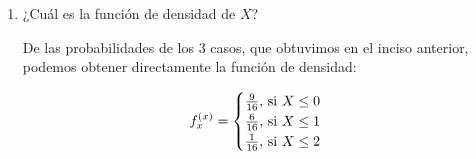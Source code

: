\documentclass[12pt,a4paper]{report}
\begin{document}
\begin{enumerate}
{\begin{enumerate}
{					Tenemos que X toma los valores $X = \{0,1,2\}$\\

					En cada caso hay una posibilidad de $\frac{1}{4}$ de que la bola entre en la primera caja, sea "b" el símbolo que represente una bola en la primera caja y "0" cuando no está en la caja, tendríamos cuatro resultados:\\

					$P(00) = (\frac{3}{4})\cdot(\frac{3}{4})$\\
					$P(0b) = (\frac{3}{4})\cdot(\frac{1}{4})$\\
					$P(b0) = (\frac{1}{4})\cdot(\frac{3}{4})$\\
					$P(bb) = (\frac{1}{4})\cdot(\frac{1}{4})$\\

					De ahí, obtenemos las probabilidades de los 3 casos:\\

					$P(X=0) = P(00) = \frac{9}{16}$\\
					$P(X=1) = P(b0) + P(0b) = \frac{3}{16} + \frac{3}{16} = \frac{6}{16}$\\
					$P(X=2) = P(bb) = \frac{1}{16}$\\

					Entonces, encontramos la función de distribución sumando las probabilidades de los casos cuando se vayan acumulando:

					\[
				F_{x}^{(x)} = \begin{cases}
								\frac{9}{16}, $ si $ X \leq 0\\
								\frac{15}{16}, $ si $ X \leq 1\\
								1, $ si $ X \leq 2\\
						 	 \end{cases}
			\]


				}

				\item {
					¿Cuál es la función de densidad de $X$?

					De las probabilidades de los 3 casos, que obtuvimos en el inciso anterior, podemos obtener directamente la función de densidad:

					\[
				f_{x}^{(x)} = \begin{cases}
								\frac{9}{16}, $ si $ X \leq 0\\
								\frac{6}{16}, $ si $ X \leq 1\\
								\frac{1}{16}, $ si $ X \leq 2\\
						 	 \end{cases}
			\]

}
\end{enumerate}}
\end{enumerate}
\end{document}
